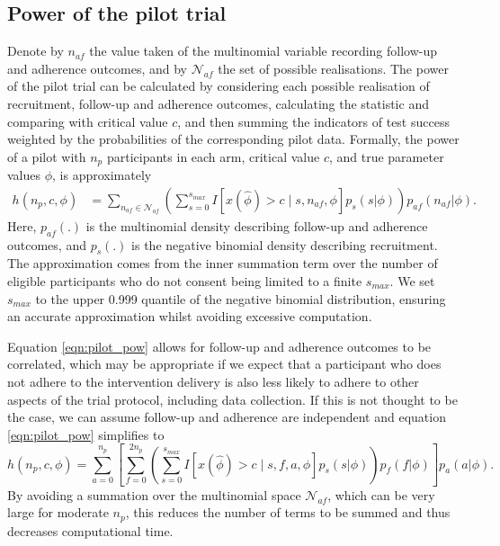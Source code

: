 \documentclass[AMA,STIX1COL]{WileyNJD-v2}
\begin{document}
\subsection{Power of the pilot trial}

Denote by $n_{af}$ the value taken of the multinomial variable recording follow-up and adherence outcomes, and by $\mathcal{N}_{af}$ the set of possible realisations. The power of the pilot trial can be calculated by considering each possible realisation of recruitment, follow-up and adherence outcomes, calculating the statistic and comparing with critical value $c$, and then summing the indicators of test success weighted by the probabilities of the corresponding pilot data. Formally, the power of a pilot with $n_p$ participants in each arm, critical value $c$, and true parameter values $\phi$, is approximately
\begin{align}\label{eqn:pilot_pow}
h(n_p, c, \phi) &= \sum_{n_{af} \in \mathcal{N}_{af}} \left( \sum_{s = 0}^{s_{max}} 
I \left[ x(\hat{\phi}) > c \mid  s, n_{af}, \phi \right] p_{s}(s | \phi) \right)     
p_{af}(n_{af} |\phi).
\end{align}
Here, $p_{af}(.)$ is the multinomial density describing follow-up and adherence outcomes, and $p_{s}(.)$ is the negative binomial density describing recruitment. The approximation comes from the inner summation term over the number of eligible participants who do not consent being limited to a finite $s_{max}$. We set  $s_{max}$ to the upper 0.999 quantile of the negative binomial distribution, ensuring an accurate approximation whilst avoiding excessive computation.

Equation \ref{eqn:pilot_pow} allows for follow-up and adherence outcomes to be correlated, which may be appropriate if we expect that a participant who does not adhere to the intervention delivery is also less likely to adhere to other aspects of the trial protocol, including data collection. If this is not thought to be the case, we can assume follow-up and adherence are independent and equation \ref{eqn:pilot_pow} simplifies to
\begin{equation*}
h(n_p, c, \phi) = \sum_{a=0}^{n_p} \left[  \sum_{f=0}^{2n_p} \left( \sum_{s = 0}^{s_{max}} 
I \left[ x(\hat{\phi}) > c \mid  s, f, a, \phi \right] p_{s}(s | \phi) \right) p_{f}(f |\phi)  \right] p_a(a | \phi).
\end{equation*}
By avoiding a summation over the multinomial space $\mathcal{N}_{af}$, which can be very large for moderate $n_p$, this reduces the number of terms to be summed and thus decreases computational time. 
\end{document}
